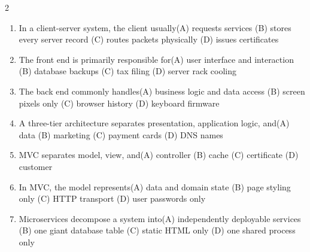 \documentclass[a4paper]{article}
\begin{document}
\begin{multicols*}{2}
\begin{enumerate}
\item In a client-server system, the client usually\newline\hspace*{0.6em}(A) requests services \quad (B) stores every server record \newline\hspace*{0.6em}(C) routes packets physically \quad (D) issues certificates
\item The front end is primarily responsible for\newline\hspace*{0.6em}(A) user interface and interaction \quad (B) database backups \newline\hspace*{0.6em}(C) tax filing \quad (D) server rack cooling
\item The back end commonly handles\newline\hspace*{0.6em}(A) business logic and data access \quad (B) screen pixels only \newline\hspace*{0.6em}(C) browser history \quad (D) keyboard firmware
\item A three-tier architecture separates presentation, application logic, and\newline\hspace*{0.6em}(A) data \quad (B) marketing \newline\hspace*{0.6em}(C) payment cards \quad (D) DNS names
\item MVC separates model, view, and\newline\hspace*{0.6em}(A) controller \quad (B) cache \newline\hspace*{0.6em}(C) certificate \quad (D) customer
\item In MVC, the model represents\newline\hspace*{0.6em}(A) data and domain state \quad (B) page styling only \newline\hspace*{0.6em}(C) HTTP transport \quad (D) user passwords only
\item Microservices decompose a system into\newline\hspace*{0.6em}(A) independently deployable services \quad (B) one giant database table \newline\hspace*{0.6em}(C) static HTML only \quad (D) one shared process only

\end{enumerate}
\end{multicols*}
\end{document}
